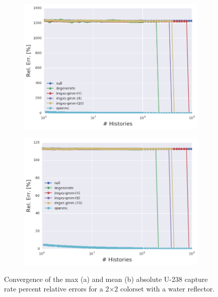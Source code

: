 \clearpage

\begin{figure}[h!]
\centering
\begin{subfigure}{\textwidth}
  \centering
  \includegraphics[width=0.9\linewidth]{figures/results/convergence/reflector/max-capt-err-evo}
  \caption{}
  \label{fig:chap11-refl-capture-converge-max}
\end{subfigure}
\begin{subfigure}{\textwidth}
  \centering
  \includegraphics[width=0.9\linewidth]{figures/results/convergence/reflector/mean-capt-err-evo}
  \caption{}
  \label{fig:chap11-refl-capture-converge-mean}
\end{subfigure}
\vspace{2mm}
\caption[Fission rate covergence for a 2$\times$2 colorset with reflector]{Convergence of the max (a) and mean (b) absolute U-238 capture rate percent relative errors for a 2$\times$2 colorset with a water reflector.}
\label{fig:chap11-refl-capture-converge}
\end{figure}

